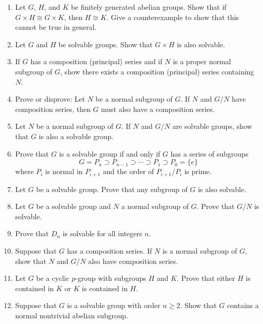 {\begin{enumerate}
\item
Let $G$, $H$, and $K$ be finitely generated abelian
groups. Show that if $G \times H \cong G \times K$, then $H
\cong K$.  Give a counterexample to show that this cannot be
true in general.
 
 
\item
Let $G$ and $H$ be solvable groups.  Show that $G \times H$ is also
solvable.
 
 
\item
If $G$ has a composition (principal) series and if $N$ is a
proper normal subgroup of $G$, show there exists a
composition (principal) series containing $N$.
 
 
 
\item
Prove or disprove:
Let $N$ be a normal subgroup of $G$.  If $N$ and $G/N$ have
composition series, then $G$ must also have a composition series.
 
\item
Let $N$ be a normal subgroup of $G$.  If $N$ and $G/N$ are solvable
groups, show that $G$ is also a solvable group.
 
\item
Prove that $G$ is a solvable group if and only if $G$ has a series of
subgroups
\[
G = P_n \supset P_{n-1} \supset \cdots \supset P_1 \supset P_0 = \{ e \}
\]
where $P_i$ is normal in $P_{i+1}$ and the order of $P_{i+1} / P_i$ is
prime. 
 
\item
Let $G$ be a solvable group.  Prove that any subgroup of $G$ is also
solvable.
 
\item
Let $G$ be a solvable group and $N$ a normal subgroup of $G$.  Prove
that $G/N$ is solvable.
 
\item
Prove that $D_n$ is solvable for all integers $n$.
 
 
\item
Suppose that $G$ has a composition series.  If $N$ is a normal
subgroup of $G$, show that $N$ and $G/N$ also have composition series.
 
\item
Let $G$ be a cyclic $p$-group with subgroups $H$ and $K$.  Prove that
either $H$ is contained in $K$ or $K$ is contained in $H$.
 
\item
Suppose that $G$ is a solvable group with order $n \geq 2$.
Show that $G$ contains a normal nontrivial abelian subgroup.
 

\end{enumerate}}
